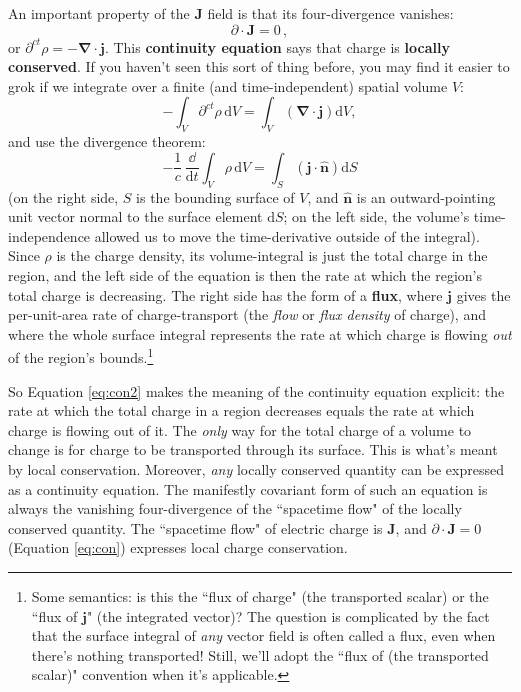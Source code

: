 \documentclass[12pt]{article}
\renewcommand{\vv}[1]{\mathbf{#1}}
\newcommand{\dd}[1]{\mathrm{d}#1}
\newcommand{\del}{\boldsymbol{\nabla}}
\begin{document}
An important property of the $\vv J$ field is that its four-divergence vanishes:
\begin{equation}\label{eq:con}
\boxed{\partialup \cdot \vv J = 0} \, ,
\end{equation}
or $\partial^{ct} \rho = - \del \cdot \vv j$. This \textbf{continuity equation} says that charge is \textbf{locally conserved}. If you haven't seen this sort of thing before, you may find it easier to grok if we integrate over a finite (and time-independent) spatial volume $V$:
\begin{equation*}
- \int_V \partial^{ct} \rho \, \dd V = \int_V \left( \del \cdot \vv j \right) \dd V ,
\end{equation*}
and use the divergence theorem:
\begin{equation}\label{eq:con2}
- \dfrac{1}{c} \, \dfrac{\dd}{\dd t} \int_V \rho \, \dd V = \int_S \left( \vv j \cdot \vv{\hat{n}} \right) \dd S
\end{equation}
(on the right side, $S$ is the bounding surface of $V$, and $\vv{\hat{n}}$ is an outward-pointing unit vector normal to the surface element $\dd S$; on the left side, the volume's time-independence allowed us to move the time-derivative outside of the integral). Since $\rho$ is the charge density, its volume-integral is just the total charge in the region, and the left side of the equation is then the rate at which the region's total charge is decreasing. The right side has the form of a \textbf{flux}, where $\vv j$ gives the per-unit-area rate of charge-transport (the \emph{flow} or \emph{flux density} of charge), and where the whole surface integral represents the rate at which charge is flowing \emph{out} of the region's bounds.\footnote{\label{fn:flux}Some semantics: is this the ``flux of charge" (the transported scalar) or the ``flux of $\vv j$" (the integrated vector)? The question is complicated by the fact that the surface integral of \emph{any} vector field is often called a flux, even when there's nothing transported! Still, we'll adopt the ``flux of (the transported scalar)" convention when it's applicable.}

So Equation \ref{eq:con2} makes the meaning of the continuity equation explicit: the rate at which the total charge in a region decreases equals the rate at which charge is flowing out of it. The \emph{only} way for the total charge of a volume to change is for charge to be transported through its surface. This is what's meant by local conservation. Moreover, \emph{any} locally conserved quantity can be expressed as a continuity equation. The manifestly covariant form of such an equation is always the vanishing four-divergence of the ``spacetime flow" of the locally conserved quantity. The ``spacetime flow" of electric charge is $\vv J$, and $\partialup \cdot \vv J =  0$ (Equation \ref{eq:con}) expresses local charge conservation.
\end{document}
